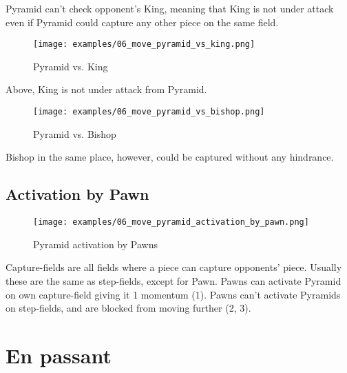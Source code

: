 Pyramid can't check opponent's King, meaning that King is not under attack
even if Pyramid could capture any other piece on the same field.

\noindent
\begin{figure}[!h]
\texttt{[image: examples/06\_move\_pyramid\_vs\_king.png]}
\caption{Pyramid vs. King}
\label{fig:06_move_pyramid_vs_king}
\end{figure}

Above, King is not under attack from Pyramid.

\noindent
\begin{figure}[!h]
\texttt{[image: examples/06\_move\_pyramid\_vs\_bishop.png]}
\caption{Pyramid vs. Bishop}
\label{fig:06_move_pyramid_vs_bishop}
\end{figure}

Bishop in the same place, however, could be captured without any hindrance.

\clearpage %

\subsection*{Activation by Pawn}

\noindent
\begin{figure}[!h]
\texttt{[image: examples/06\_move\_pyramid\_activation\_by\_pawn.png]}
\caption{Pyramid activation by Pawns}
\label{fig:06_move_pyramid_activation_by_pawn}
\end{figure}

Capture-fields are all fields where a piece can capture opponents' piece.
Usually these are the same as step-fields, except for Pawn. Pawns can activate
Pyramid on own capture-field giving it 1 momentum (1). Pawns can't activate
Pyramids on step-fields, and are blocked from moving further (2, 3).

\clearpage %

\section*{En passant}

